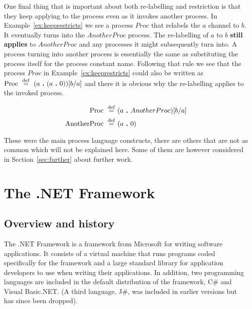 	One final thing that is important about both re-labelling and restriction is 
	that they keep applying to the process even as it invokes another process. 
	In Example~\ref{ex:keeprestricts} we see a process $Proc$ that relabels the 
	$a$ channel to $b$. It eventually turns into the $AnotherProc$ process. The 
	re-labelling of $a$ to $b$ \textbf{still applies} to $AnotherProc$ and any 
	processes it might subsequently turn into. A process turning into another 
	process is essentially the same as substituting the process itself for the 
	process constant name. Following that rule we see that the process $Proc$ in 
	Example~\ref{ex:keeprestricts} could also be written as $\mathrm{Proc} 
	\ \stackrel{\mathrm{def}}{=}\  (a \ \textbf{.}\  (a \ \textbf{.}\  0))[b/a]$ and there it is obvious why the 
	re-labelling applies to the invoked process.
  
	\begin{Exa}\label{ex:keeprestricts}
	\begin{align*}
			\mathrm{Proc} \ \stackrel{\mathrm{def}}{=}\  & (a \ \textbf{.}\  AnotherProc)[b/a]  \\
			\mathrm{AnotherProc} \ \stackrel{\mathrm{def}}{=}\  & (a \ \textbf{.}\  0)  \\
	\end{align*}	
	\end{Exa}
	
	These were the main process language constructs, there are others that are 
	not as common which will not be explained here. Some of them are however 
	considered in Section~\ref{sec:further} about further work.
	
\section{The .NET Framework}

\subsection{Overview and history}
	The .NET Framework is a framework from Microsoft for writing software 
	applications. It consists of a virtual machine that runs programs coded 
	specifically for the framework and a large standard library for application 
	developers to use when writing their applications. In addition, two 
	programming languages are included in the default distribution of the 
	framework, C\# and Visual Basic.NET. (A third language, J\#, was included in
	earlier versions but has since been dropped).

